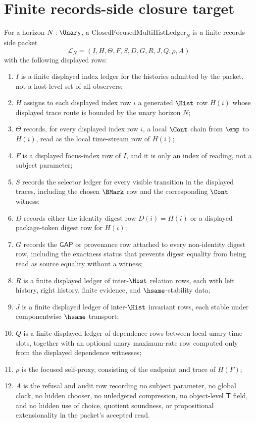 \section{Finite records-side closure target}
\label{sec:consciousness-universe-finite-closure-target}

\begin{definition}
\label{def:closed-focused-multihist-ledger}
For a horizon $N:\Unary$, a $\mathrm{ClosedFocusedMultiHistLedger}_N$ is a finite records-side packet
$$
\mathcal{L}_N=(I,H,\Theta,F,S,D,G,R,J,Q,\rho,A)
$$
with the following displayed rows:
\begin{enumerate}
\item $I$ is a finite displayed index ledger for the histories admitted by the packet, not a host-level set of all observers;
\item $H$ assigns to each displayed index row $i$ a generated $\Hist$ row $H(i)$ whose displayed trace route is bounded by the unary horizon $N$;
\item $\Theta$ records, for every displayed index row $i$, a local $\Cont$ chain from $\emp$ to $H(i)$, read as the local time-stream row of $H(i)$;
\item $F$ is a displayed focus-index row of $I$, and it is only an index of reading, not a subject parameter;
\item $S$ records the selector ledger for every visible transition in the displayed traces, including the chosen $\BMark$ row and the corresponding $\Cont$ witness;
\item $D$ records either the identity digest row $D(i)=H(i)$ or a displayed package-token digest row for $H(i)$;
\item $G$ records the $\mathsf{GAP}$ or provenance row attached to every non-identity digest row, including the exactness status that prevents digest equality from being read as source equality without a witness;
\item $R$ is a finite displayed ledger of inter-$\Hist$ relation rows, each with left history, right history, finite evidence, and $\hsame$-stability data;
\item $J$ is a finite displayed ledger of inter-$\Hist$ invariant rows, each stable under componentwise $\hsame$ transport;
\item $Q$ is a finite displayed ledger of dependence rows between local unary time slots, together with an optional unary maximum-rate row computed only from the displayed dependence witnesses;
\item $\rho$ is the focused self-proxy, consisting of the endpoint and trace of $H(F)$;
\item $A$ is the refusal and audit row recording no subject parameter, no global clock, no hidden chooser, no unledgered compression, no object-level $\mathsf{T}$ field, and no hidden use of choice, quotient soundness, or propositional extensionality in the packet's accepted read.
\end{enumerate}
\end{definition}

